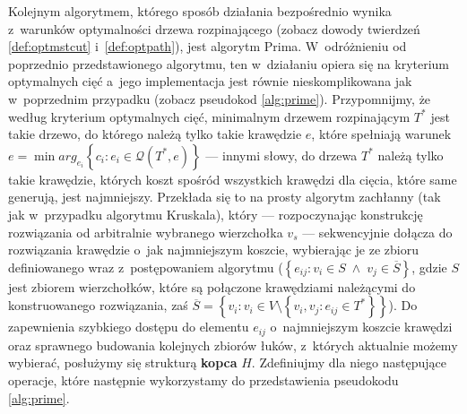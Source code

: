 Kolejnym algorytmem, którego sposób działania bezpośrednio wynika z~warunków optymalności drzewa rozpinającego (zobacz dowody twierdzeń \ref{def:optmstcut} i~\ref{def:optpath}), jest algorytm Prima.
W~odróżnieniu od poprzednio przedstawionego algorytmu, ten w~działaniu opiera się na kryterium optymalnych cięć a~jego implementacja jest równie nieskomplikowana jak w~poprzednim przypadku (zobacz pseudokod \ref{alg:prime}).
Przypomnijmy, że według kryterium optymalnych cięć, minimalnym drzewem rozpinającym $T^{\ast}$ jest takie drzewo, do którego należą tylko takie krawędzie $e$, które spełniają warunek $e = \min arg_{e_{i}} \left\{ c_{i} : e_{i} \in \mathcal{Q} \left( T^{\ast}, e \right) \right\}$ --- innymi słowy, do drzewa $T^{\ast}$ należą tylko takie krawędzie, których koszt spośród wszystkich krawędzi dla cięcia, które same generują, jest najmniejszy.
Przekłada się to na prosty algorytm zachłanny (tak jak w~przypadku algorytmu Kruskala), który --- rozpoczynając konstrukcję rozwiązania od arbitralnie wybranego wierzchołka $v_{s}$ --- sekwencyjnie dołącza do rozwiązania krawędzie o~jak najmniejszym koszcie, wybierając je ze zbioru definiowanego wraz z~postępowaniem algorytmu ($\left\{ e_{ij} : v_{i} \in S \; \wedge \; v_{j} \in \overline{S} \right\}$, gdzie $S$ jest zbiorem wierzchołków, które są połączone krawędziami należącymi do konstruowanego rozwiązania, zaś $\overline{S} = \left\{ v_{i} : v_{i} \in V \setminus \left\{ v_{i}, v_{j} : e_{ij} \in T^{\ast} \right\} \right\}$).
Do zapewnienia szybkiego dostępu do elementu $e_{ij}$ o~najmniejszym koszcie krawędzi oraz sprawnego budowania kolejnych zbiorów łuków, z~których aktualnie możemy wybierać, posłużymy się strukturą \textbf{kopca} $H$.
Zdefiniujmy dla niego następujące operacje, które następnie wykorzystamy do przedstawienia pseudokodu \ref{alg:prime}.

